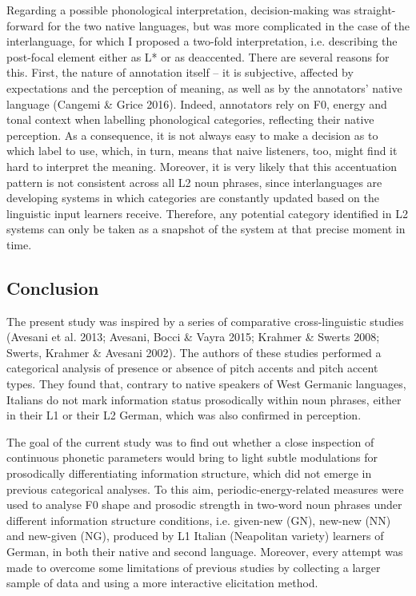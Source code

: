 \begin{styleStandard}
Regarding a possible phonological interpretation, decision-making was straight-forward for the two native languages, but was more complicated in the case of the interlanguage, for which I proposed a two-fold interpretation, i.e. describing the post-focal element either as L* or as deaccented. There are several reasons for this. First, the nature of annotation itself – it is subjective, affected by expectations and the perception of meaning, as well as by the annotators’ native language (Cangemi \& Grice 2016). Indeed, annotators rely on F0, energy and tonal context when labelling phonological categories, reflecting their native perception. As a consequence, it is not always easy to make a decision as to which label to use, which, in turn, means that naive listeners, too, might find it hard to interpret the meaning. Moreover, it is very likely that this accentuation pattern is not consistent across all L2 noun phrases, since interlanguages are developing systems in which categories are constantly updated based on the linguistic input learners receive. Therefore, any potential category identified in L2 systems can only be taken as a snapshot of the system at that precise moment in time.
\end{styleStandard}

\subsection{Conclusion}
\hypertarget{Toc191305922}{}\begin{styleStandard}
The present study was inspired by a series of comparative cross-linguistic studies (Avesani et al. 2013; Avesani, Bocci \& Vayra 2015; Krahmer \& Swerts 2008; Swerts, Krahmer \& Avesani 2002). The authors of these studies performed a categorical analysis of presence or absence of pitch accents and pitch accent types. They found that, contrary to native speakers of West Germanic languages, Italians do not mark information status prosodically within noun phrases, either in their L1 or their L2 German, which was also confirmed in perception.
\end{styleStandard}

\begin{styleStandard}
The goal of the current study was to find out whether a close inspection of continuous phonetic parameters would bring to light subtle modulations for prosodically differentiating information structure, which did not emerge in previous categorical analyses. To this aim, periodic-energy-related measures were used to analyse F0 shape and prosodic strength in two-word noun phrases under different information structure conditions, i.e. given-new (GN), new-new (NN) and new-given (NG), produced by L1 Italian (Neapolitan variety) learners of German, in both their native and second language. Moreover, every attempt was made to overcome some limitations of previous studies by collecting a larger sample of data and using a more interactive elicitation method.
\end{styleStandard}

